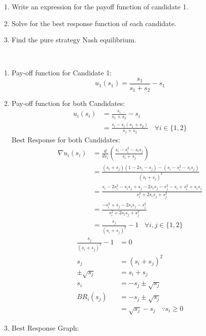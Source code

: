 \documentclass[12pt]{article}
\newenvironment{solution}[2][Solution]{\begin{trivlist}
\item[\hskip \labelsep {\bfseries #1}]}{\end{trivlist}}
\begin{document}
\begin{enumerate}[label=\alph*)]
\item Write an expression for the payoff function of candidate 1.
\item Solve for the best response function of each candidate.
\item Find the pure strategy Nash equilibrium.
\end{enumerate}

\begin{solution}{}~\\
\begin{enumerate}[label=\alph*)]
\item Pay-off function for Candidate 1:\\

$$u_1(s_1)=\frac{s_1}{s_1+s_2}-s_1$$
\item Pay-off function for both Candidates:\\
\begin{align*}
u_i(s_i)&=\frac{s_i}{s_1+s_2}-s_i\\
&=\frac{s_i-s_i(s_1+s_2)}{s_1+s_2}\ \ \ \ \forall i \in\{1,2\}
\end{align*}
Best Response for both Candidates:\\
\begin{align*}
\nabla u_i(s_i)&=\frac{d}{ds_i}\left(\frac{s_i-s_i^2-s_is_j}{s_i+s_j}\right)\\
&=\frac{(s_i+s_j)(1-2s_i-s_j)-(s_i-s_i^2-s_is_j)}{(s_i+s_j)^2}\\
&=\frac{s_i-2s_i^2-s_is_j+s_j-2s_is_j-s_j^2-s_i+s_i^2+s_is_j}{s_i^2+2s_is_j+s_j^2}\\
&=\frac{-s_i^2+s_j-2s_is_j-s_j^2}{s_i^2+2s_is_j+s_j^2}\\
&=\frac{s_j}{(s_i+s_j)^2}-1\ \ \ \ \forall i,j \in\{1,2\}
\end{align*}
\begin{align*}
\frac{s_j}{(s_i+s_j)^2}-1&=0\\
s_j&=(s_i+s_j)^2\\
\pm\sqrt{s_j}&=s_i+s_j\\
s_i&=-s_j\pm\sqrt{s_j}\\
BR_i(s_j)&=-s_j\pm\sqrt{s_j}\\
&=\sqrt{s_j}-s_j\ \ \ \ \because s_i\geq0
\end{align*}
\pagebreak
\item Best Response Graph:\\



\end{enumerate}
\end{solution}
\end{document}
